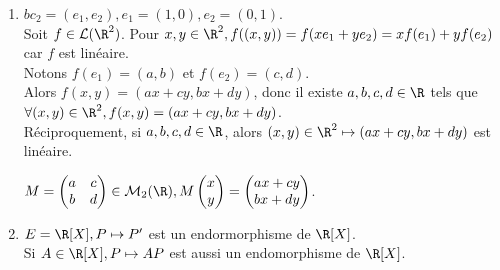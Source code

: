 \documentclass[12pt, a4paper]{report}
\begin{document}
\begin{exemple}[Exemples]{}
\begin{enumerate}
	\item {}
	
	$bc_2 = (e_1,e_2), e_1 = (1,0),e_2 = (0,1)$. \\
	Soit $f \in \mathcal{L}(\R^2)$. Pour $x,y \in \R^2, f((x,y)) = f(xe_1+ye_2) = xf(e_1)+yf(e_2)$ car $f$ est linéaire. \\
	Notons $f(e_1) = (a,b)$ et $f(e_2) = (c,d)$. \\
	Alors $f(x,y) = (ax+cy,bx+dy)$, donc il existe $a,b,c,d\in \R$ tels que $\forall (x,y) \in \R^2, f(x,y) = (ax+cy,bx+dy)$. \\
	Réciproquement, si $a,b,c,d \in \R$, alors $(x,y) \in \R^2 \mapsto (ax+cy,bx+dy)$ est linéaire.
	
	\begin{remarque}{}
	$M = 
	\begin{pmatrix}
	a & c \\
	b & d
	\end{pmatrix} \in \mathcal{M}_2(\R), 
	M \begin{pmatrix}
	x \\ y
	\end{pmatrix}
	= 
	\begin{pmatrix}
	ax+cy \\ bx + dy
	\end{pmatrix}$.
	\end{remarque}
	
	\item $E = \R[X], P \mapsto P'$ est un endormorphisme de $\R[X]$. \\
	Si $A \in \R[X], P \mapsto AP$ est aussi un endomorphisme de $\R[X]$.
	
\end{enumerate}
\end{exemple}

\end{document}
